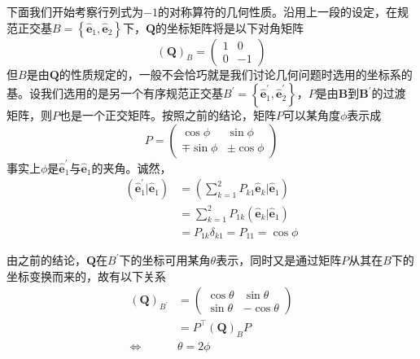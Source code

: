 \documentclass[main.tex]{subfiles}
\begin{document}
下面我们开始考察行列式为$-1$的对称算符的几何性质。沿用上一段的设定，在规范正交基$B=\left\{\mathbf{\hat{e}}_1,\mathbf{\hat{e}}_2\right\}$下，$\mathbf{Q}$的坐标矩阵将是以下对角矩阵
\[\left(\mathbf{Q}\right)_B=\left(\begin{array}{cc}1&0\\0&-1\end{array}\right)\]
但$B$是由$\mathbf{Q}$的性质规定的，一般不会恰巧就是我们讨论几何问题时选用的坐标系的基。设我们选用的是另一个有序规范正交基$B^\prime=\left\{\mathbf{\hat{e}}^\prime_1,\mathbf{\hat{e}}^\prime_2\right\}$，$P$是由$\mathbf{B}$到$\mathbf{B}^\prime$的过渡矩阵，则$P$也是一个正交矩阵。按照之前的结论，矩阵$P$可以某角度$\phi$表示成
\[P=\left(\begin{array}{cc}\cos\phi&\sin\phi\\\mp\sin\phi&\pm\cos\phi\end{array}\right)\]
事实上$\phi$是$\mathbf{\hat{e}}^\prime_1$与$\mathbf{\hat{e}}_1$的夹角。诚然，
\begin{align*}
    \left(\mathbf{\hat{e}}^\prime_1|\mathbf{\hat{e}}_1\right) & =\left(\sum_{k=1}^2P_{k1}\mathbf{\hat{e}}_k|\mathbf{\hat{e}}_1\right) \\
                                                              & =\sum_{k=1}^2P_{1k}\left(\mathbf{\hat{e}}_k|\mathbf{\hat{e}}_1\right) \\
                                                              & =P_{1k}\delta_{k1}=P_{11}=\cos\phi
\end{align*}

由之前的结论，$\mathbf{Q}$在$B^\prime$下的坐标可用某角$\theta$表示，同时又是通过矩阵$P$从其在$B$下的坐标变换而来的，故有以下关系
\begin{align*}
    \left(\mathbf{Q}\right)_{B^\prime} & =\left(\begin{array}{cc}\cos\theta&\sin\theta\\\sin\theta&-\cos\theta\end{array}\right) \\
                                       & =P^{\intercal}\left(\mathbf{Q}\right)_BP                                                \\
    \Leftrightarrow                    & \theta=2\phi
\end{align*}
\end{document}

